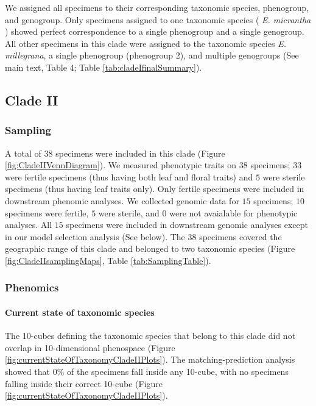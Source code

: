 \documentclass[
  11pt,
]{article}
\begin{document}
We assigned all specimens to their corresponding taxonomic species, phenogroup, and genogroup. Only specimens assigned to one taxonomic species ( \emph{E. micrantha} ) showed perfect correspondence to a single phenogroup and a single genogroup. All other specimens in this clade were assigned to the taxonomic species \emph{E. millegrana}, a single phenogroup (phenogroup 2), and multiple genogroups (See main text, Table 4; Table \ref{tab:cladeIfinalSummary}).

\hypertarget{clade-ii}{%
\subsection{Clade II}\label{clade-ii}}

\hypertarget{sampling-2}{%
\subsubsection{Sampling}\label{sampling-2}}

A total of \(38\) specimens were included in this clade (Figure \ref{fig:CladeIIVennDiagram}). We measured phenotypic traits on \(38\) specimens; \(33\) were fertile specimens (thus having both leaf and floral traits) and \(5\) were sterile specimens (thus having leaf traits only). Only fertile specimens were included in downstream phenomic analyses. We collected genomic data for \(15\) specimens; \(10\) specimens were fertile, \(5\) were sterile, and \(0\) were not avaialable for phenotypic analyses. All \(15\) specimens were included in downstream genomic analyses except in our model selection analysis (See below). The \(38\) specimens covered the geographic range of this clade and belonged to two taxonomic species (Figure \ref{fig:CladeIIsamplingMaps}, Table \ref{tab:SamplingTable}).

\hypertarget{phenomics-2}{%
\subsubsection{Phenomics}\label{phenomics-2}}

\hypertarget{current-state-of-taxonomic-species-1}{%
\paragraph{Current state of taxonomic species}\label{current-state-of-taxonomic-species-1}}

The 10-cubes defining the taxonomic species that belong to this clade did not overlap in 10-dimensional phenospace (Figure \ref{fig:currentStateOfTaxonomyCladeIIPlots}). The matching-prediction analysis showed that \(0\)\% of the specimens fall inside any 10-cube, with no specimens falling inside their correct 10-cube (Figure \ref{fig:currentStateOfTaxonomyCladeIIPlots}).
\end{document}
